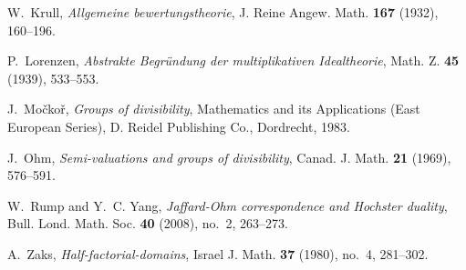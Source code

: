 \documentclass[reqno]{amsart}
\theoremstyle{plain}
\theoremstyle{definition}
\numberwithin{equation}{lem}
\begin{document}
\begin{thebibliography}{10}
W.\ Krull, \emph{Allgemeine bewertungstheorie}, J. Reine Angew. Math.
  \textbf{167} (1932), 160--196.

P.~Lorenzen, \emph{Abstrakte {B}egr\"undung der multiplikativen
  {I}dealtheorie}, Math. Z. \textbf{45} (1939), 533--553. 

J.~Mo\v{c}ko\v{r}, \emph{Groups of divisibility}, Mathematics and its
  Applications (East European Series), D. Reidel Publishing Co., Dordrecht,
  1983. 

J.~Ohm, \emph{Semi-valuations and groups of divisibility}, Canad. J. Math.
  \textbf{21} (1969), 576--591. 

W.~Rump and Y.~C. Yang, \emph{Jaffard-{O}hm correspondence and {H}ochster
  duality}, Bull. Lond. Math. Soc. \textbf{40} (2008), no.~2, 263--273.

A.~Zaks, \emph{Half-factorial-domains}, Israel J. Math. \textbf{37} (1980),
  no.~4, 281--302. 

\end{thebibliography}


\end{document}

